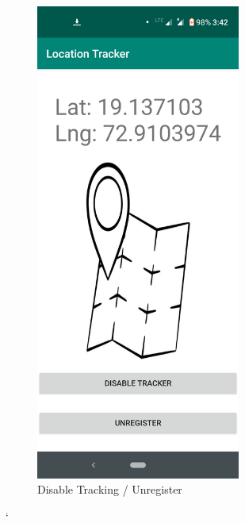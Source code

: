 \documentclass{article}
\begin{document}
\begin{itemize}
\begin{figure}[!tbp]
\begin{minipage}[b]{0.4\textwidth}
    \includegraphics[width=0.6\textwidth]{images/Disabletracker.png}
    \caption{Disable Tracking / Unregister}
  \end{minipage}
\end{figure}

\end{itemize}
\newpage`
\end{document}
